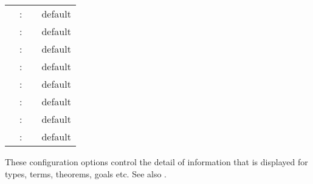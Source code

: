 \begin{isabellebody}
\begin{isamarkuptext}
\begin{tabular}{rcll}
    \indexdef{}{attribute}{short\_names}\hypertarget{attribute.short-names}{\hyperlink{attribute.short-names}{\mbox{\isa{short{\isaliteral{5F}{\isacharunderscore}}names}}}} & : & \isa{attribute} & default \isa{false} \\
    \indexdef{}{attribute}{unique\_names}\hypertarget{attribute.unique-names}{\hyperlink{attribute.unique-names}{\mbox{\isa{unique{\isaliteral{5F}{\isacharunderscore}}names}}}} & : & \isa{attribute} & default \isa{true} \\
    \indexdef{}{attribute}{eta\_contract}\hypertarget{attribute.eta-contract}{\hyperlink{attribute.eta-contract}{\mbox{\isa{eta{\isaliteral{5F}{\isacharunderscore}}contract}}}} & : & \isa{attribute} & default \isa{true} \\
    \indexdef{}{attribute}{goals\_limit}\hypertarget{attribute.goals-limit}{\hyperlink{attribute.goals-limit}{\mbox{\isa{goals{\isaliteral{5F}{\isacharunderscore}}limit}}}} & : & \isa{attribute} & default \isa{{\isadigit{1}}{\isadigit{0}}} \\
    \indexdef{}{attribute}{show\_main\_goal}\hypertarget{attribute.show-main-goal}{\hyperlink{attribute.show-main-goal}{\mbox{\isa{show{\isaliteral{5F}{\isacharunderscore}}main{\isaliteral{5F}{\isacharunderscore}}goal}}}} & : & \isa{attribute} & default \isa{false} \\
    \indexdef{}{attribute}{show\_hyps}\hypertarget{attribute.show-hyps}{\hyperlink{attribute.show-hyps}{\mbox{\isa{show{\isaliteral{5F}{\isacharunderscore}}hyps}}}} & : & \isa{attribute} & default \isa{false} \\
    \indexdef{}{attribute}{show\_tags}\hypertarget{attribute.show-tags}{\hyperlink{attribute.show-tags}{\mbox{\isa{show{\isaliteral{5F}{\isacharunderscore}}tags}}}} & : & \isa{attribute} & default \isa{false} \\
    \indexdef{}{attribute}{show\_question\_marks}\hypertarget{attribute.show-question-marks}{\hyperlink{attribute.show-question-marks}{\mbox{\isa{show{\isaliteral{5F}{\isacharunderscore}}question{\isaliteral{5F}{\isacharunderscore}}marks}}}} & : & \isa{attribute} & default \isa{true} \\
  \end{tabular}
  \medskip

  These configuration options control the detail of information that
  is displayed for types, terms, theorems, goals etc.  See also
  .

  \begin{description}


\end{description}
\end{isamarkuptext}
\end{isabellebody}
